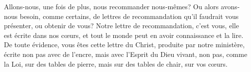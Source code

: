 Allons-nous, une fois de plus, nous recommander nous-mêmes?
Ou alors avons-nous besoin, comme certains, de lettres de recommandation
	qu’il faudrait vous présenter, ou obtenir de vous?
Notre lettre de recommandation, c’est vous,
	elle est écrite dans nos cœurs,
	et tout le monde peut en avoir connaissance et la lire.
De toute évidence,
	vous êtes cette lettre du Christ, produite par notre ministère,
	écrite non pas avec de l’encre, mais avec l’Esprit du Dieu vivant,
	non pas, comme la Loi, sur des tables de pierre,
	mais sur des tables de chair, sur vos cœurs.
